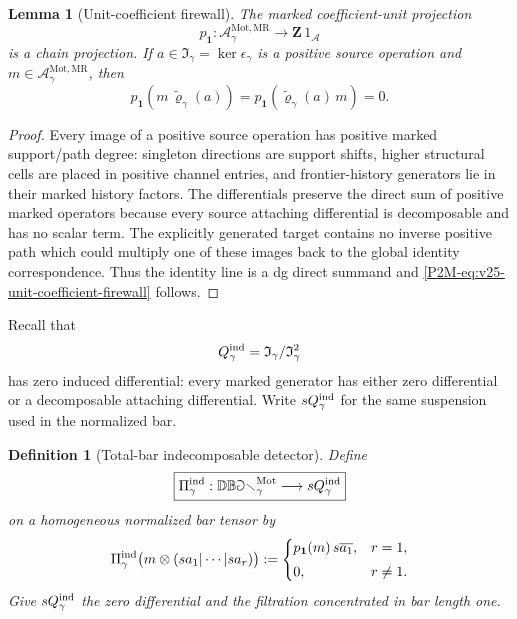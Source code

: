 \documentclass[11pt]{article}
\newtheorem{lemma}[theorem]{Lemma}
\newtheorem{definition}[theorem]{Definition}
\theoremstyle{remark}
\newcommand{\Z}{\mathbf Z}
\newcommand{\Mot}{\mathrm{Mot}}
\newcommand{\MR}{\mathrm{MR}}
\begin{document}
\begin{lemma}[Unit-coefficient firewall]
\label{P2M-lem:v25-unit-coefficient-firewall}
The marked coefficient-unit projection
\[
 p_{\mathbf1}:
 \mathscr A_\gamma^{\Mot,\MR}\longrightarrow \Z\,1_{\mathscr A}
\]
is a chain projection.  If
\(a\in\mathfrak I_\gamma=\ker\epsilon_\gamma\) is a positive source operation
and \(m\in\mathscr A_\gamma^{\Mot,\MR}\), then
\begin{equation}\label{P2M-eq:v25-unit-coefficient-firewall}
 \boxed{
 p_{\mathbf1}\!\left(
   m\,\widetilde\varrho_\gamma(a)
 \right)
 =
 p_{\mathbf1}\!\left(
   \widetilde\varrho_\gamma(a)\,m
 \right)
 =0.}
\end{equation}
\end{lemma}

\begin{proof}
Every image of a positive source operation has positive marked support/path
degree: singleton directions are support shifts, higher structural cells are
placed in positive channel entries, and frontier-history generators lie in
their marked history factors.  The differentials preserve the direct sum of
positive marked operators because every source attaching differential is
decomposable and has no scalar term.  The explicitly generated target contains
no inverse positive path which could multiply one of these images back to the
global identity correspondence.  Thus the identity line is a dg direct
summand and \eqref{P2M-eq:v25-unit-coefficient-firewall} follows.
\end{proof}

Recall that
\[
 Q_\gamma^{\rm ind}
 =
 \mathfrak I_\gamma/\mathfrak I_\gamma^2
\]
has zero induced differential: every marked generator has either zero
differential or a decomposable attaching differential.  Write
\(sQ_\gamma^{\rm ind}\) for the same suspension used in the normalized bar.

\begin{definition}[Total-bar indecomposable detector]
\label{P2M-def:v25-total-bar-ind-detector}
Define
\begin{equation}\label{P2M-eq:v25-total-bar-ind-detector}
 \boxed{
 \Pi_\gamma^{\rm ind}:
 \mathbb{DBar}_\gamma^{\Mot}
 \longrightarrow
 sQ_\gamma^{\rm ind}}
\end{equation}
on a homogeneous normalized bar tensor by
\[
 \Pi_\gamma^{\rm ind}
 \bigl(
 m\otimes(sa_1|\cdots|sa_r)
 \bigr)
 :=
 \begin{cases}
 p_{\mathbf1}(m)\,s\overline{a_1},&r=1,\\[1mm]
 0,&r\ne1.
 \end{cases}
\]
Give \(sQ_\gamma^{\rm ind}\) the zero differential and the filtration
concentrated in bar length one.
\end{definition}
\end{document}
